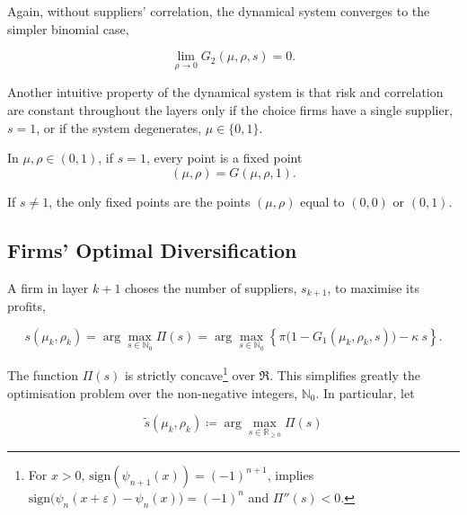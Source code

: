 \documentclass[../../main.tex]{subfiles}
\begin{document}
Again, without suppliers' correlation, the dynamical system converges to the simpler binomial case,

\begin{equation}
  \lim_{\rho \rightarrow 0} G_2(\mu, \rho, s) = 0.
\end{equation}

Another intuitive property of the dynamical system is that risk and correlation are constant throughout the layers only if the choice firms have a single supplier, $s = 1$, or if the system degenerates, $\mu \in \{0, 1\}$. 

\begin{lemma} \label{lemma:interior_fixed_points}
  In $\mu, \rho \in (0, 1)$, if $s = 1$, every point is a fixed point \begin{equation}
    (\mu, \rho) = G(\mu, \rho, 1). 
  \end{equation}
\end{lemma}

\begin{lemma} \label{lemma:exterior_fixed_points}
  If $s \neq 1$, the only fixed points are the points $(\mu, \rho)$ equal to $(0, 0)$  or $(0, 1)$.
\end{lemma}

\subsection{Firms' Optimal Diversification}

A firm in layer $k + 1$ choses the number of suppliers, $s_{k + 1}$, to maximise its profits, 

\begin{equation} \label{eq:firm_problem}
  s(\mu_k, \rho_k) = \arg\max_{s \in \mathbb{N}_0} \Pi(s) = \arg\max_{s \in \mathbb{N}_0} \left\{ \pi \Big(1 - G_1(\mu_k, \rho_k, s)\Big) - \kappa \  s \right\}.
\end{equation}

The function $\Pi(s)$ is strictly concave\footnote{
  For $x > 0$, $\text{sign}(\psi_{n + 1}(x)) = (-1)^{n + 1}$, implies $\text{sign}\big(\psi_n(x + \varepsilon) - \psi_n(x) \big) = (-1)^n$ and $\Pi''(s) < 0$.
} over $\Re$. This simplifies greatly the optimisation problem over the non-negative integers, $\mathbb{N}_0$. In particular, let

\begin{equation}
  \tilde{s}(\mu_k, \rho_k) \coloneqq \arg\max_{s \in \mathbb{R}_{\geq 0}} \Pi(s)
\end{equation}
\end{document}
